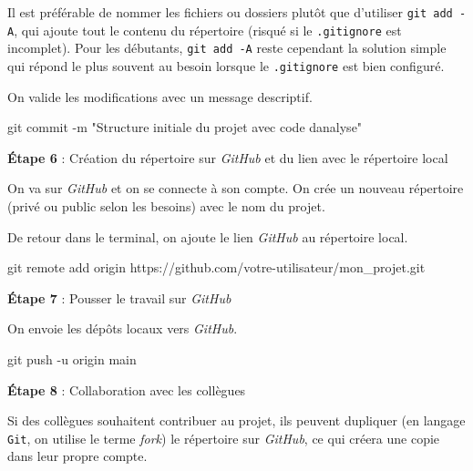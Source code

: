 \documentclass[
  letterpaper,
  DIV=11,
  numbers=noendperiod,
  oneside]{scrreprt}
\newenvironment{Shaded}{\begin{snugshade}}{\end{snugshade}}
\newcommand{\AttributeTok}[1]{\textcolor[rgb]{0.40,0.45,0.13}{#1}}
\newcommand{\FunctionTok}[1]{\textcolor[rgb]{0.28,0.35,0.67}{#1}}
\newcommand{\NormalTok}[1]{\textcolor[rgb]{0.00,0.23,0.31}{#1}}
\newcommand{\StringTok}[1]{\textcolor[rgb]{0.13,0.47,0.30}{#1}}
\begin{document}
Il est préférable de nommer les fichiers ou dossiers plutôt que
d'utiliser \texttt{git\ add\ -A}, qui ajoute tout le contenu du
répertoire (risqué si le \texttt{.gitignore} est incomplet). Pour les
débutants, \texttt{git\ add\ -A} reste cependant la solution simple qui
répond le plus souvent au besoin lorsque le \texttt{.gitignore} est bien
configuré.

On valide les modifications avec un message descriptif.

\begin{Shaded}
\begin{Highlighting}[]
\FunctionTok{git}\NormalTok{ commit }\AttributeTok{{-}m} \StringTok{"Structure initiale du projet avec code d\textquotesingle{}analyse"}
\end{Highlighting}
\end{Shaded}

\textbf{Étape 6} : Création du répertoire sur \emph{GitHub} et du lien
avec le répertoire local

On va sur \emph{GitHub} et on se connecte à son compte. On crée un
nouveau répertoire (privé ou public selon les besoins) avec le nom du
projet.

De retour dans le terminal, on ajoute le lien \emph{GitHub} au
répertoire local.

\begin{Shaded}
\begin{Highlighting}[]
\FunctionTok{git}\NormalTok{ remote add origin https://github.com/votre{-}utilisateur/mon\_projet.git}
\end{Highlighting}
\end{Shaded}

\textbf{Étape 7} : Pousser le travail sur \emph{GitHub}

On envoie les dépôts locaux vers \emph{GitHub}.

\begin{Shaded}
\begin{Highlighting}[]
\FunctionTok{git}\NormalTok{ push }\AttributeTok{{-}u}\NormalTok{ origin main}
\end{Highlighting}
\end{Shaded}

\textbf{Étape 8} : Collaboration avec les collègues

Si des collègues souhaitent contribuer au projet, ils peuvent dupliquer
(en langage \texttt{Git}, on utilise le terme \emph{fork}) le répertoire
sur \emph{GitHub}, ce qui créera une copie dans leur propre compte.
\end{document}
